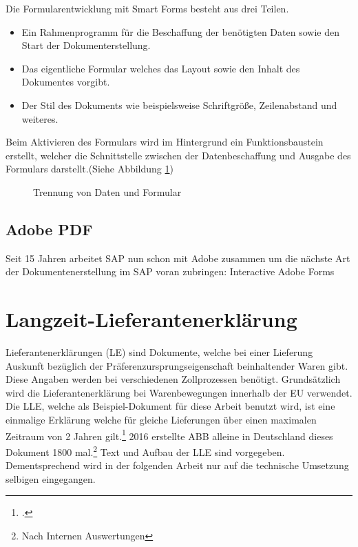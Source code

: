 Die Formularentwicklung mit Smart Forms besteht aus drei Teilen. 

\begin{itemize}
	\item Ein Rahmenprogramm für die Beschaffung der benötigten Daten sowie den Start der Dokumenterstellung.
	\item Das eigentliche Formular welches das Layout sowie den Inhalt des Dokumentes vorgibt.
	\item Der Stil des Dokuments wie beispielsweise Schriftgröße, Zeilenabstand und weiteres.
\end{itemize}

Beim Aktivieren des Formulars wird im Hintergrund ein Funktionsbaustein erstellt, welcher die Schnittstelle zwischen der Datenbeschaffung und Ausgabe des Formulars darstellt.(Siehe Abbildung \ref{fig3})

\begin{figure}[!h]
	\centering
	
	\caption{Trennung von Daten und Formular}
	\label{fig3}
	
\end{figure} 


\subsection{Adobe PDF}

Seit 15 Jahren arbeitet SAP nun schon mit Adobe zusammen um die nächste Art der Dokumentenerstellung im SAP voran zubringen: Interactive Adobe Forms


\section{Langzeit-Lieferantenerklärung}

 Lieferantenerklärungen (LE) sind Dokumente, welche bei einer Lieferung Auskunft bezüglich der Präferenzursprungseigenschaft beinhaltender Waren gibt. Diese Angaben werden bei verschiedenen Zollprozessen benötigt. Grundsätzlich wird die Lieferantenerklärung bei Warenbewegungen innerhalb der \ac{EU} verwendet. Die \ac{LLE}, welche als Beispiel-Dokument für diese Arbeit benutzt wird, ist eine einmalige Erklärung welche für gleiche Lieferungen über einen maximalen Zeitraum von 2 Jahren gilt.\footcite{ZOLL.2017} 2016 erstellte ABB alleine in Deutschland dieses Dokument 1800 mal.\footnote{Nach Internen Auswertungen} Text und Aufbau der \ac{LLE} sind vorgegeben. Dementsprechend wird in der folgenden Arbeit nur auf die technische Umsetzung selbigen eingegangen.
